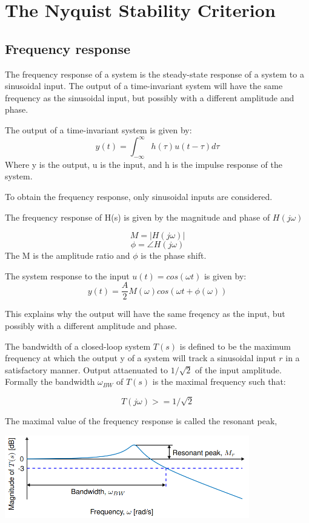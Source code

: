 \section{The Nyquist Stability Criterion}

\subsection{Frequency response}
The frequency response of a system is the steady-state response of a system to a sinusoidal input.
The output of a time-invariant system will have the same frequency as the sinusoidal input,
but possibly with a different amplitude and phase.

The output of a time-invariant system is given by:
$$y(t) = \int_{-\infty}^{\infty} h(\tau)u(t-\tau)d\tau$$
Where y is the output, u  is the input, and h is the impulse response of the system.

To obtain the frequency response, only sinusoidal inputs are considered.

The frequency response of H(s) is given by the magnitude and phase of $H(j\omega)$

$$M = |H(j\omega)|$$
$$\phi = \angle H(j\omega)$$
The M is the amplitude ratio and $\phi$ is the phase shift.

The system response to the input $u(t) = cos(\omega t)$ is given by:
$$y(t) = \frac{A}{2} M(\omega) cos(\omega t + \phi(\omega))$$

This explains why the output will have the same freqency as the input, but possibly with a different amplitude and phase.

The bandwidth of a closed-loop system $T(s)$ is defined to be the maximum frequency at which
the output y of a system will track a sinusoidal input $r$ in a satisfactory manner. Output attaenuated to $1/\sqrt{2}$ of the input amplitude.
Formally the bandwidth $\omega_{BW}$ of $T(s)$ is the maximal frequency such that:

$$T(j\omega) >= 1/\sqrt{2}$$

The maximal value of the frequency response is called the resonant peak,

\begin{center}
	\includegraphics[width=0.8\textwidth]{Images/resonantPeak.png}
\end{center}

